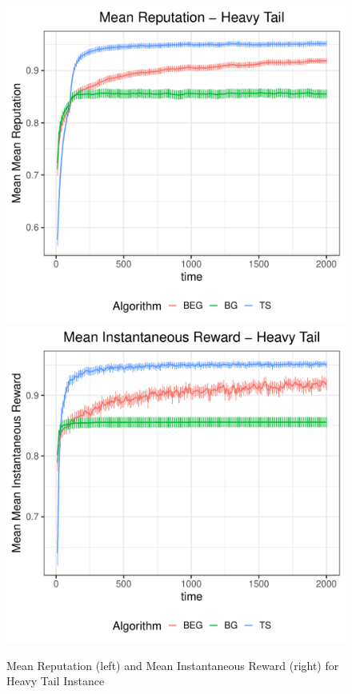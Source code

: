 \documentclass[../competing_bandits_with_appendix.tex]{subfiles}
\begin{document}
\begin{figure}[h]
\begin{center}
\includegraphics[scale=0.35]{ec19paper/figures/ht_mean}
\includegraphics[scale=0.35]{ec19paper/figures/mean_inst_reward_ht}
\caption{Mean Reputation (left) and Mean Instantaneous Reward (right) for Heavy Tail Instance}
\end{center}
\end{figure}
\end{document}
